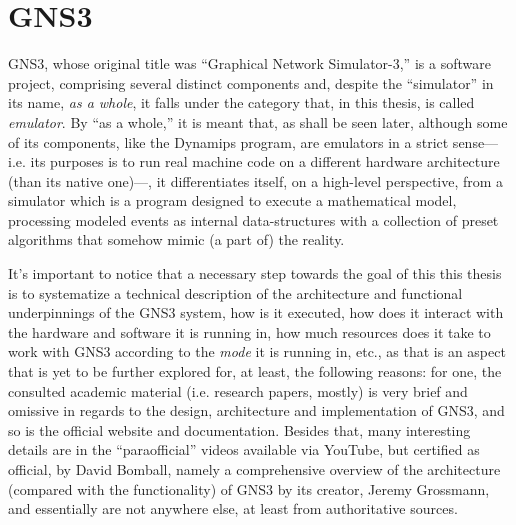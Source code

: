 
\chapter{GNS3}
\label{ch:gns3}

GNS3, whose original title was ``Graphical Network Simulator-3,'' is a software project, comprising several distinct components and, despite the ``simulator'' in its name, \emph{as a whole}, it falls under the category that, in this thesis, is called \emph{emulator}. %
By ``as a whole,'' it is meant that, as shall be seen later, although some of its components, like the Dynamips program, are emulators in a strict sense---i.e. its purposes is to run real machine code on a different hardware architecture (than its native one)---, it differentiates itself, on a high-level perspective, from a simulator which is a program designed to execute a mathematical model, processing modeled events as internal data-structures with a collection of preset algorithms that somehow mimic (a part of) the reality.

It's important to notice that a necessary step towards the goal of this this thesis is to systematize a technical description of the architecture and functional underpinnings of the GNS3 system, how is it executed, how does it interact with the hardware and software it is running in, how much resources does it take to work with GNS3 according to the \emph{mode} it is running in, etc., as that is an aspect that is yet to be further explored for, at least, the following reasons:  %
for one, the consulted academic material (i.e. research papers, mostly) is very brief and omissive in regards to the design, architecture and implementation of GNS3, and so is the official website and documentation. Besides that, many interesting details are in the ``paraofficial'' videos available via YouTube, but certified as official, by David Bomball, namely a comprehensive overview of the architecture (compared with the functionality) of GNS3 by its creator, Jeremy Grossmann, and essentially are not anywhere else, at least from authoritative sources. %


